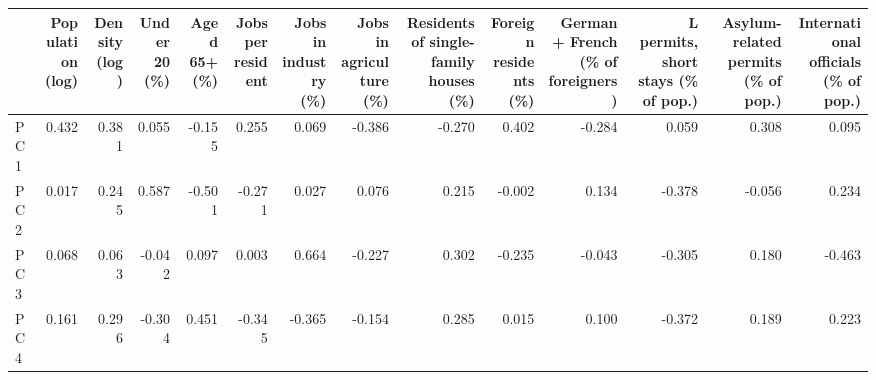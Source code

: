\begin{tabular}{lrrrrrrrrrrrrr}
\toprule
 & Population (log) & Density (log) & Under 20 (\%) & Aged 65+ (\%) & Jobs per resident & Jobs in industry (\%) & Jobs in agriculture (\%) & Residents of single-family houses (\%) & Foreign residents (\%) & German + French (\% of foreigners) & L permits, short stays (\% of pop.) & Asylum-related permits (\% of pop.) & International officials (\% of pop.) \\
\midrule
PC1 & 0.432 & 0.381 & 0.055 & -0.155 & 0.255 & 0.069 & -0.386 & -0.270 & 0.402 & -0.284 & 0.059 & 0.308 & 0.095 \\
PC2 & 0.017 & 0.245 & 0.587 & -0.501 & -0.271 & 0.027 & 0.076 & 0.215 & -0.002 & 0.134 & -0.378 & -0.056 & 0.234 \\
PC3 & 0.068 & 0.063 & -0.042 & 0.097 & 0.003 & 0.664 & -0.227 & 0.302 & -0.235 & -0.043 & -0.305 & 0.180 & -0.463 \\
PC4 & 0.161 & 0.296 & -0.304 & 0.451 & -0.345 & -0.365 & -0.154 & 0.285 & 0.015 & 0.100 & -0.372 & 0.189 & 0.223 \\
\bottomrule
\end{tabular}
